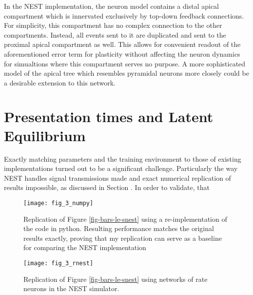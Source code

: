 In the NEST implementation, the neuron model contains a distal apical compartment which is innervated exclusively by top-down
feedback connections. For simplicity, this compartment has no complex connection to the other compartments. Instead,
all events sent to it are duplicated and sent to the proximal apical compartment as well. This allows for convenient 
readout of the aforementioned error term for plasticity without affecting the neuron dynamics for simualtions where 
this compartment serves no purpose. A more sophisticated model of the apical tree which resembles pyramidal neurons more
closely could be a desirable extension to this network.

\section{Presentation times and Latent Equilibrium}\label{sec-appendix-t-pres}

Exactly matching parameters and the training environment to those of existing implementations turned out to be a
significant challenge. Particularly the way NEST handles signal transmissions made and exact numerical replication of
results impossible, as discussed in Section . In order to validate, that



\begin{figure}[t]
    \centering
    \texttt{[image: fig\_3\_numpy]}
    \caption{Replication of Figure \ref{fig-bars-le-snest} using a re-implementation of the \cite{Haider2021} code in
        python. Resulting performance matches the original results exactly, proving that my replication can serve as a
        baseline for comparing the NEST implementation}
    \label{fig-bars-le-numpy}
\end{figure}


\begin{figure}[t]
    \centering
    \texttt{[image: fig\_3\_rnest]}
    \caption{Replication of Figure \ref{fig-bars-le-snest} using networks of rate neurons in the NEST simulator.}
    \label{fig-bars-le-rnest}
\end{figure}


